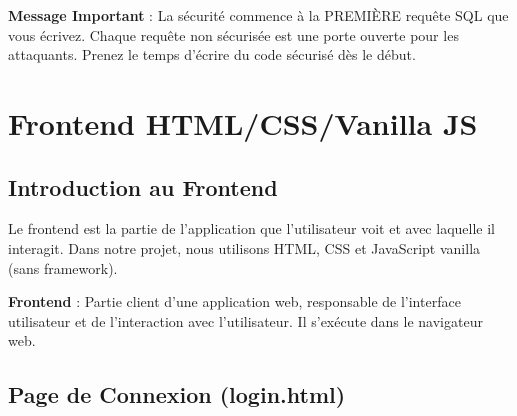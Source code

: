 \begin{securitybox}
    \textbf{Message Important} :
    La sécurité commence à la PREMIÈRE requête SQL que vous écrivez. Chaque requête non sécurisée est une porte ouverte pour les attaquants. Prenez le temps d'écrire du code sécurisé dès le début.
\end{securitybox}

\chapter{Frontend HTML/CSS/Vanilla JS}

\section{Introduction au Frontend}

Le frontend est la partie de l'application que l'utilisateur voit et avec laquelle il interagit. Dans notre projet, nous utilisons HTML, CSS et JavaScript vanilla (sans framework).

\begin{definitionbox}
    \textbf{Frontend} : Partie client d'une application web, responsable de l'interface utilisateur et de l'interaction avec l'utilisateur. Il s'exécute dans le navigateur web.
\end{definitionbox}

\section{Page de Connexion (login.html)}

